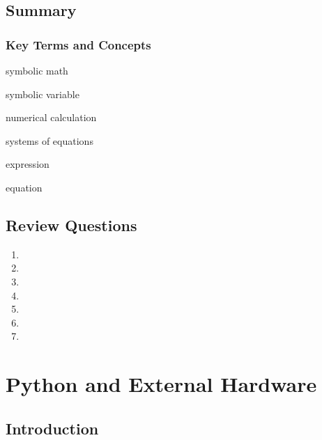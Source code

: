 \documentclass{book}
\begin{document}
    
        \section{Summary}\label{summary}
    




    
        \subsection{Key Terms and Concepts}\label{key-terms-and-concepts}
    




    
        symbolic math

symbolic variable

numerical calculation

systems of equations

expression

equation
    




    
        \section{Review Questions}\label{review-questions}
    




    
        \begin{enumerate}
\def\labelenumi{\arabic{enumi}.}
\item
\item
\item
\item
\item
\item
\item
\end{enumerate}
    




    
        \chapter{Python and External
Hardware}\label{python-and-external-hardware}
    




    
        \section{Introduction}\label{introduction}
    
\end{document}
